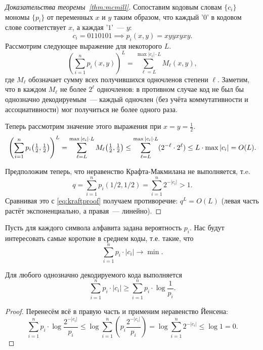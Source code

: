 \documentclass[12pt]{article}
\begin{document}
\begin{proof}[Доказательства теоремы~\ref{thm:mcmill}]
    Сопоставим кодовым словам $\{c_i\}$ мономы $\{p_i\}$ от переменных $x$ и $y$ таким 
    образом, что каждый '$0$' в кодовом слове соответствует $x$, а каждая '$1$'~--- $y$:
    \[
        c_i = 0110101 \implies p_i(x,y) = xyyxyxy.
    \]
    Рассмотрим следующее выражение для некоторого $L$.
    \[
        \left( \sum_{i=1}^n p_i(x,y) \right)^L = \sum_{\ell=L}^{\max|c_i| \cdot
        L} M_\ell(x,y),
    \]
    где $M_\ell$ обозначает сумму всех получившихся одночленов степени $\ell$.
    Заметим, что в каждом $M_\ell$ не более $2^\ell$ одночленов: в противном
    случае код не был бы однозначно декодируемым~--- каждый одночлен (без учёта
    коммутативности и ассоциативности) мог получиться не более одного раза.
    
    Теперь рассмотрим значение этого выражения при \(x = y = \frac12\).
    \begin{equation}\label{eq:kraftproof}
        \left( \sum_{i=1}^n p_i\bigl({\textstyle\frac12},{\textstyle\frac12}\bigr) \right)^L =
        \sum_{\ell=L}^{\max|c_i| \cdot L} M_\ell\bigl({\textstyle\frac12},{\textstyle\frac12}\bigr) \le 
        \sum_{\ell=L}^{\max|c_i| \cdot L} (2^{-\ell} \cdot 2^\ell) \le 
        L\cdot\max|c_i| = O(L).
    \end{equation}

    Предположим теперь, что неравенство Крафта-Макмилана не выполняется, т.e.
    \[
        q = \sum_{i=1}^n p_i(1/2,1/2) = \sum_{i=1}^n 2^{-|c_i|} > 1.
    \]
    Сравнивая это с \eqref{eq:kraftproof} получаем противоречие:
    \(
        q^L = O(L)    
    \) 
    (левая часть растёт экспоненциально, а правая~— линейно).
\end{proof}

Пусть для каждого символа алфавита задана вероятность $p_i$. Нас будут
интересовать самые короткие в среднем коды, т.е. такие, что 
\[
        \sum_{i=1}^n p_i\cdot|c_i| \to \min. 
\]
\begin{theorem}[Шеннон]
    Для любого однозначно декодируемого кода выполняется
    \[
        \sum_{i=1}^n p_i\cdot|c_i|\ge \sum_{i=1}^n p_i\cdot \log\frac1{p_i}. 
    \]
\end{theorem}
\begin{proof}
    Перенесём всё в правую часть и применим неравенство Йенсена:
    \[
    \sum_{i=1}^n p_i\cdot\log\frac{2^{-|c_i|}}{p_i}\le 
    \log\sum_{i=1}^n \left(p_i\frac{2^{-|c_i|}}{p_i}\right) = 
    \log\sum_{i=1}^n 2^{-|c_i|} \le \log 1 = 0. 
    \]
\end{proof}
\end{document}
